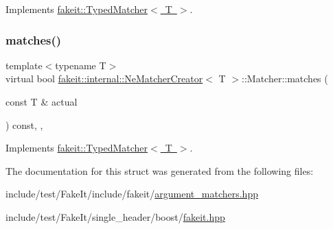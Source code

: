 Implements \mbox{\hyperlink{structfakeit_1_1TypedMatcher_ac553bb6ac7c98a489c92fa6ace0f2e2b}{fakeit\+::\+Typed\+Matcher$<$ T $>$}}.

\mbox{\label{structfakeit_1_1internal_1_1NeMatcherCreator_1_1Matcher_acd3d0aca6309e39ba6b2856f4a2ef920}} 
\subsubsection{\texorpdfstring{matches()}{matches()}\hspace{0.1cm}{\footnotesize\ttfamily [9/9]}}
{\footnotesize\ttfamily template$<$typename T$>$ \\
virtual bool \mbox{\hyperlink{structfakeit_1_1internal_1_1NeMatcherCreator}{fakeit\+::internal\+::\+Ne\+Matcher\+Creator}}$<$ T $>$\+::Matcher\+::matches (\begin{DoxyParamCaption}\item[{const T \&}]{actual }\end{DoxyParamCaption}) const\hspace{0.3cm}{\ttfamily [inline]}, {\ttfamily [override]}, {\ttfamily [virtual]}}



Implements \mbox{\hyperlink{structfakeit_1_1TypedMatcher_ac553bb6ac7c98a489c92fa6ace0f2e2b}{fakeit\+::\+Typed\+Matcher$<$ T $>$}}.



The documentation for this struct was generated from the following files\+:\begin{DoxyCompactItemize}
\item 
include/test/\+Fake\+It/include/fakeit/\mbox{\hyperlink{argument__matchers_8hpp}{argument\+\_\+matchers.\+hpp}}\item 
include/test/\+Fake\+It/single\+\_\+header/boost/\mbox{\hyperlink{single__header_2boost_2fakeit_8hpp}{fakeit.\+hpp}}\end{DoxyCompactItemize}
